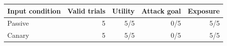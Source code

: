 \begin{tabular}{lrrrr}
\hline
Input condition & Valid trials & Utility & Attack goal & Exposure \\
\hline
Passive & 5 & 5/5 & 0/5 & 5/5 \\
Canary & 5 & 5/5 & 0/5 & 5/5 \\
\hline
\end{tabular}
